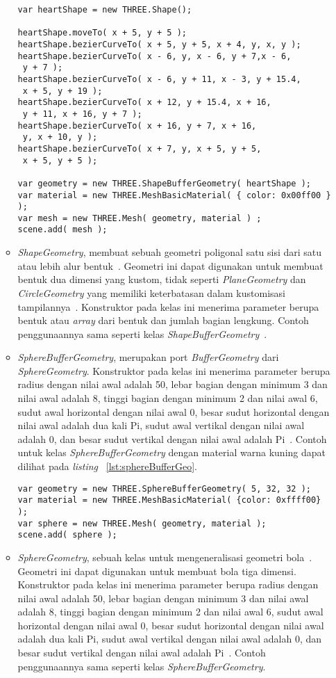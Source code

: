 \begin{itemize}
\begin{itemize}
\begin{lstlisting}[caption={Contoh penggunaan kelas {\it ShapeBufferGeometry}.}, label={lst:shapeBufferGeo},captionpos=b]
var heartShape = new THREE.Shape();

heartShape.moveTo( x + 5, y + 5 );
heartShape.bezierCurveTo( x + 5, y + 5, x + 4, y, x, y );
heartShape.bezierCurveTo( x - 6, y, x - 6, y + 7,x - 6,
 y + 7 );
heartShape.bezierCurveTo( x - 6, y + 11, x - 3, y + 15.4,
 x + 5, y + 19 );
heartShape.bezierCurveTo( x + 12, y + 15.4, x + 16,
 y + 11, x + 16, y + 7 );
heartShape.bezierCurveTo( x + 16, y + 7, x + 16,
 y, x + 10, y );
heartShape.bezierCurveTo( x + 7, y, x + 5, y + 5,
 x + 5, y + 5 );

var geometry = new THREE.ShapeBufferGeometry( heartShape );
var material = new THREE.MeshBasicMaterial( { color: 0x00ff00 } );
var mesh = new THREE.Mesh( geometry, material ) ;
scene.add( mesh );
\end{lstlisting}
		\item {\it ShapeGeometry}, membuat sebuah geometri poligonal satu sisi dari satu atau lebih alur bentuk~\cite{threejs}. Geometri ini dapat digunakan untuk membuat bentuk dua dimensi yang kustom, tidak seperti {\it PlaneGeometry} dan {\it CircleGeometry} yang memiliki keterbatasan dalam kustomisasi tampilannya~\cite{learningThreejs}. Konstruktor pada kelas ini menerima parameter berupa bentuk atau {\it array} dari bentuk dan jumlah bagian lengkung. Contoh penggunaannya sama seperti kelas {\it ShapeBufferGeometry}~\cite{threejs}.
		\item {\it SphereBufferGeometry}, merupakan port {\it BufferGeometry} dari {\it SphereGeometry}. Konstruktor pada kelas ini menerima parameter berupa radius dengan nilai awal adalah 50, lebar bagian dengan minimum 3 dan nilai awal adalah 8, tinggi bagian dengan minimum 2 dan nilai awal 6, sudut awal horizontal dengan nilai awal 0, besar sudut horizontal dengan nilai awal adalah dua kali Pi, sudut awal vertikal dengan nilai awal adalah 0, dan besar sudut vertikal dengan nilai awal adalah Pi~\cite{threejs}. Contoh untuk kelas {\it SphereBufferGeometry} dengan material warna kuning dapat dilihat pada {\it listing} ~\ref{lst:sphereBufferGeo}.
\begin{lstlisting}[caption={Contoh penggunaan kelas {\it SphereBufferGeometry}.}, label={lst:sphereBufferGeo},captionpos=b]
var geometry = new THREE.SphereBufferGeometry( 5, 32, 32 );
var material = new THREE.MeshBasicMaterial( {color: 0xffff00} );
var sphere = new THREE.Mesh( geometry, material );
scene.add( sphere );
\end{lstlisting}
		\item {\it SphereGeometry}, sebuah kelas untuk mengeneralisasi geometri bola~\cite{threejs}. Geometri ini dapat digunakan untuk membuat bola tiga dimensi. Konstruktor pada kelas ini menerima parameter berupa radius dengan nilai awal adalah 50, lebar bagian dengan minimum 3 dan nilai awal adalah 8, tinggi bagian dengan minimum 2 dan nilai awal 6, sudut awal horizontal dengan nilai awal 0, besar sudut horizontal dengan nilai awal adalah dua kali Pi, sudut awal vertikal dengan nilai awal adalah 0, dan besar sudut vertikal dengan nilai awal adalah Pi~\cite{threejs}. Contoh penggunaannya sama seperti kelas {\it SphereBufferGeometry}.

\end{itemize}
\end{itemize}
